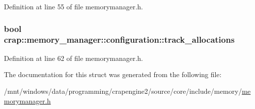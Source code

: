 Definition at line 55 of file memorymanager.\+h.

\hypertarget{structcrap_1_1memory__manager_1_1configuration_a1e65aab18541fd1200bc32e344de79f7}{
\subsubsection[{track\+\_\+allocations}]{\setlength{\rightskip}{0pt plus 5cm}bool crap\+::memory\+\_\+manager\+::configuration\+::track\+\_\+allocations}}\label{structcrap_1_1memory__manager_1_1configuration_a1e65aab18541fd1200bc32e344de79f7}


Definition at line 62 of file memorymanager.\+h.



The documentation for this struct was generated from the following file\+:\begin{DoxyCompactItemize}
\item 
/mnt/windows/data/programming/crapengine2/source/core/include/memory/\hyperlink{memorymanager_8h}{memorymanager.\+h}\end{DoxyCompactItemize}
